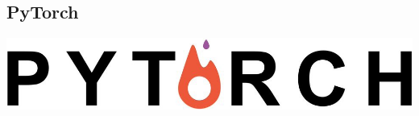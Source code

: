 \documentclass[hyperref={pdfpagelabels=false}]{beamer}
\begin{document}
     \subsection{PyTorch} %
     \begin{frame}[c] %
       \begin{center}
         \vspace{8mm}
         \includegraphics[scale=0.15]{logo_pytorch.png}
       \end{center}
     \end{frame}
\end{document}
